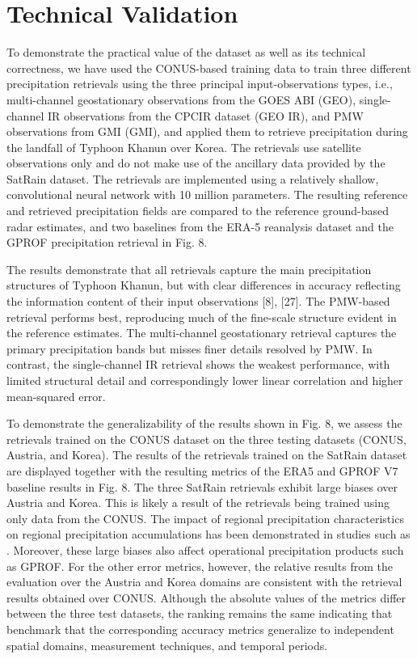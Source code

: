 \documentclass[11pt]{article}
\begin{document}
\section{Technical Validation}

To demonstrate the practical value of the dataset as well as its technical
correctness, we have used the CONUS-based training data to train three different
precipitation retrievals using the three principal input-observations types,
i.e., multi-channel geostationary observations from the GOES ABI (GEO),
single-channel IR observations from the CPCIR dataset (GEO IR), and PMW
observations from GMI (GMI), and applied them to retrieve precipitation during
the landfall of Typhoon Khanun over Korea. The retrievals use satellite
observations only and do not make use of the ancillary data provided by the
SatRain dataset. The retrievals are implemented using a relatively shallow,
convolutional neural network with 10 million parameters. The resulting reference
and retrieved precipitation fields are compared to the reference ground-based
radar estimates, and two baselines from the ERA-5 reanalysis dataset and the
GPROF precipitation retrieval in Fig. 8.

The results demonstrate that all retrievals capture the main precipitation
structures of Typhoon Khanun, but with clear differences in accuracy reflecting
the information content of their input observations [8], [27]. The PMW-based
retrieval performs best, reproducing much of the fine-scale structure evident in
the reference estimates. The multi-channel geostationary retrieval captures the
primary precipitation bands but misses finer details resolved by PMW. In
contrast, the single-channel IR retrieval shows the weakest performance, with
limited structural detail and correspondingly lower linear correlation and
higher mean-squared error.


 To demonstrate the generalizability of the results shown in Fig. 8, we assess
 the retrievals trained on the CONUS dataset on the three testing datasets
 (CONUS, Austria, and Korea). The results of the retrievals trained on the
 SatRain dataset are displayed together with the resulting metrics of the ERA5
 and GPROF V7 baseline results in Fig. 8. The three SatRain retrievals exhibit
 large biases over Austria and Korea. This is likely a result of the retrievals
 being trained using only data from the CONUS. The impact of regional
 precipitation characteristics on regional precipitation accumulations has been
 demonstrated in studies such as . Moreover, these large biases also affect
 operational precipitation products such as GPROF. For the other error metrics,
 however, the relative results from the evaluation over the Austria and Korea
 domains are consistent with the retrieval results obtained over CONUS. Although
 the absolute values of the metrics differ between the three test datasets, the
 ranking remains the same indicating that benchmark that the corresponding
 accuracy metrics generalize to independent spatial domains, measurement
 techniques, and temporal periods.
\end{document}
